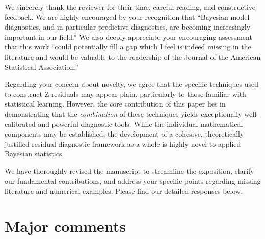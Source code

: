 \documentclass[11pt]{article}
\begin{document}
We sincerely thank the reviewer for their time, careful reading, and constructive feedback. We are highly encouraged by your recognition that ``Bayesian model diagnostics, and in particular predictive diagnostics, are becoming increasingly important in our field.'' We also deeply appreciate your encouraging assessment that this work ``could potentially fill a gap which I feel is indeed missing in the literature and would be valuable to the readership of the Journal of the American Statistical Association.''

Regarding your concern about novelty, we agree that the specific techniques used to construct Z-residuals may appear plain, particularly to those familiar with statistical learning. However, the core contribution of this paper lies in demonstrating that the \textit{combination} of these techniques yields exceptionally well-calibrated and powerful diagnostic tools. While the individual mathematical components may be established, the development of a cohesive, theoretically justified residual diagnostic framework as a whole is highly novel to applied Bayesian statistics. 

We have thoroughly revised the manuscript to streamline the exposition, clarify our fundamental contributions, and address your specific points regarding missing literature and numerical examples. Please find our detailed responses below.



\section*{Major comments}
\end{document}
